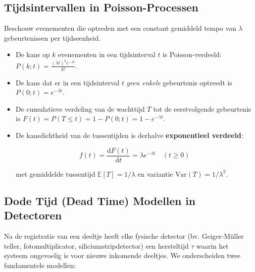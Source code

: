 \documentclass[11pt,a4paper]{article}
\newcommand{\E}{\mathbb{E}}
\newcommand{\Var}{\text{Var}}
\newcommand{\dd}{\mathrm{d}}
\begin{document}
\subsection{Tijdsintervallen in Poisson-Processen}
Beschouw evenementen die optreden met een constant gemiddeld tempo van $\lambda$ gebeurtenissen per tijdseenheid.
\begin{itemize}[leftmargin=1.5em]
    \item De kans op $k$ evenementen in een tijdsinterval $t$ is Poisson-verdeeld: $P(k; t) = \frac{(\lambda t)^k e^{-\lambda t}}{k!}$.
    \item De kans dat er in een tijdsinterval $t$ \emph{geen enkele} gebeurtenis optreedt is $P(0; t) = e^{-\lambda t}$.
    \item De cumulatieve verdeling van de wachttijd $T$ tot de eerstvolgende gebeurtenis is $F(t) = P(T \le t) = 1 - P(0; t) = 1 - e^{-\lambda t}$.
    \item De kansdichtheid van de tussentijden is derhalve \textbf{exponentieel verdeeld}:
    \begin{formulabox}
    \begin{equation}
        f(t) = \frac{\dd F(t)}{\dd t} = \lambda e^{-\lambda t} \quad (t \ge 0)
    \end{equation}
    \end{formulabox}
    met gemiddelde tussentijd $\E[T] = 1/\lambda$ en variantie $\Var(T) = 1/\lambda^2$.
\end{itemize}

\subsection{Dode Tijd (Dead Time) Modellen in Detectoren}
Na de registratie van een deeltje heeft elke fysische detector (bv. Geiger-Müller teller, fotomultiplicator, siliciumstripdetector) een hersteltijd $\tau$ waarin het systeem ongevoelig is voor nieuwe inkomende deeltjes. We onderscheiden twee fundamentele modellen:
\end{document}
